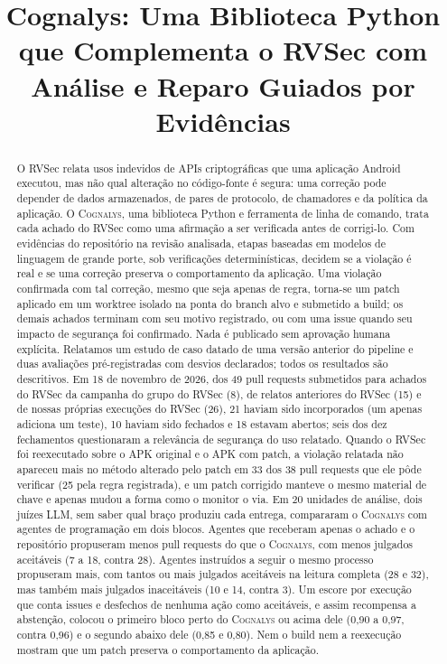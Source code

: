 \documentclass[conference]{IEEEtran}
\title{Cognalys: Uma Biblioteca Python que Complementa o RVSec com Análise e Reparo Guiados por Evidências}
\author{\IEEEauthorblockN{João Pedro Antonow}
\IEEEauthorblockA{Departamento de Ciência da Computação (CIC)\\
Universidade de Brasília (UnB)\\
Brasília, Brasil\\
\texttt{jpantonow@gmail.com}\\[3pt]
Orientador: Prof.\ Rodrigo Bonifácio\\Coorientador: Prof.\ Guilherme Novaes Ramos}}
\newcommand{\system}{\textsc{Cognalys}}
\begin{document}
\renewcommand{\IEEEkeywordsname}{Palavras-chave}

\maketitle

\begin{abstract}
O RVSec relata usos indevidos de APIs criptográficas que uma aplicação Android executou,
mas não qual alteração no código-fonte é segura: uma correção pode depender de dados armazenados, de
pares de protocolo, de chamadores e da política da aplicação. O \system, uma biblioteca Python e
ferramenta de linha de comando, trata cada achado do RVSec como uma afirmação a ser verificada antes
de corrigi-lo. Com evidências do repositório na revisão analisada, etapas baseadas em modelos
de linguagem de grande porte, sob verificações determinísticas, decidem se a violação
é real e se uma correção preserva o comportamento da aplicação. Uma
violação confirmada com tal correção, mesmo que seja apenas de regra, torna-se um patch aplicado em um
worktree isolado na ponta do branch alvo e submetido a build; os demais achados
terminam com seu motivo registrado, ou com uma issue quando seu impacto de segurança
foi confirmado. Nada é publicado sem aprovação humana explícita.
Relatamos um estudo de caso datado de uma versão anterior do pipeline e duas
avaliações pré-registradas com desvios declarados; todos os resultados são
descritivos. Em 18 de novembro de 2026, dos 49 pull requests submetidos para achados
do RVSec da campanha do grupo do RVSec (8), de relatos anteriores do RVSec (15)
e de nossas próprias execuções do RVSec (26), 21 haviam sido incorporados (um apenas adiciona um teste), 10 haviam sido fechados e 18
estavam abertos; seis dos dez fechamentos questionaram a relevância de segurança do
uso relatado. Quando o RVSec foi reexecutado sobre o APK original e o APK com patch, a
violação relatada não apareceu mais no método alterado pelo patch em 33 dos
38 pull requests que ele pôde verificar (25 pela regra registrada), e um patch corrigido manteve
o mesmo material de chave e apenas mudou a forma como o monitor o via. Em 20 unidades de análise, dois juízes LLM, sem saber qual braço produziu cada
entrega, compararam o \system{} com agentes de programação em dois blocos. Agentes
que receberam apenas o achado e o repositório propuseram menos pull requests do
que o \system{}, com menos julgados aceitáveis (7 a 18, contra 28). Agentes
instruídos a seguir o mesmo processo propuseram mais, com tantos ou mais julgados
aceitáveis na leitura completa (28 e 32), mas também mais julgados inaceitáveis
(10 e 14, contra 3). Um escore por execução que conta issues e desfechos de nenhuma
ação como aceitáveis, e assim recompensa a abstenção, colocou o primeiro bloco
perto do \system{} ou acima dele (0,90 a 0,97, contra 0,96) e o segundo abaixo
dele (0,85 e 0,80). Nem o build nem a reexecução mostram que um patch preserva o
comportamento da aplicação.
\end{abstract}
\end{document}
